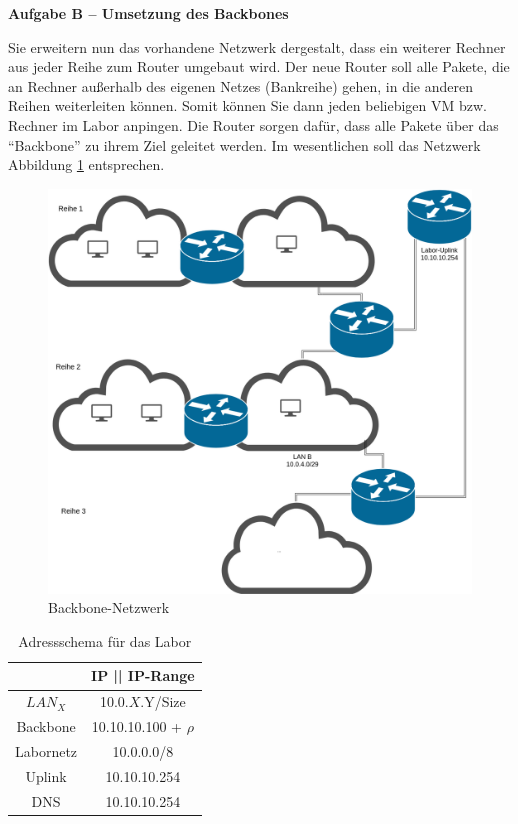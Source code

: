 \documentclass[paper=a4,fontsize=11pt]{scrartcl}%
\numberwithin{equation}{section}
\begin{document}
\begin{center}\Large{\textbf{Aufgabe B -- Umsetzung des Backbones}}\end{center}\vskip0.25in
Sie erweitern nun das vorhandene Netzwerk dergestalt, dass ein weiterer Rechner aus jeder Reihe zum Router umgebaut wird. Der neue Router soll alle Pakete, die an Rechner außerhalb des eigenen Netzes (Bankreihe) gehen, in die anderen Reihen weiterleiten können. Somit können Sie dann jeden beliebigen VM bzw. Rechner im Labor anpingen. Die Router sorgen dafür, dass alle Pakete über das \enquote{Backbone} zu ihrem Ziel geleitet werden. Im wesentlichen soll das Netzwerk Abbildung \ref{backbone} entsprechen. 
\begin{figure}[H]
	\center
	\includegraphics[scale=0.2]{backbone}
	\caption{Backbone-Netzwerk}
	\label{backbone}
\end{figure}
\begin{table}[H]
\caption{Adressschema für das Labor}
\label{adress_scheme}
\centering
\begin{tabular}{|c|c|}\hline
 & \textbf{IP  || IP-Range} \\ \hline
 $LAN_X$ & 10.0.$X$.Y/Size \\ \hline
 Backbone & 10.10.10.100 + $\rho$ \\ \hline
 Labornetz & 10.0.0.0/8 \\ \hline
 Uplink & 10.10.10.254 \\ \hline
 DNS & 10.10.10.254 \\ \hline
\end{tabular}
\end{table} 
\end{document}
